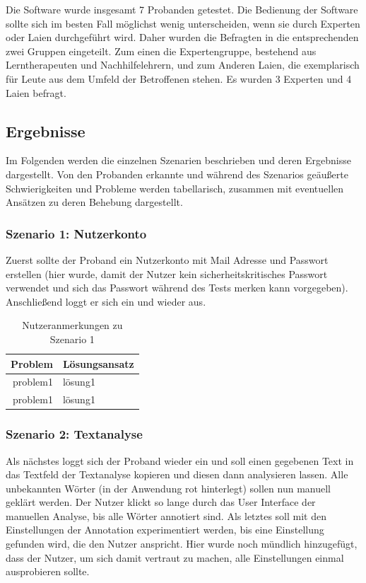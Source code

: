 Die Software wurde insgesamt 7 Probanden getestet. Die Bedienung der Software sollte sich im besten Fall möglichst wenig unterscheiden, wenn sie durch Experten oder Laien durchgeführt wird. Daher wurden die Befragten in die entsprechenden zwei Gruppen eingeteilt. Zum einen die Expertengruppe, bestehend aus Lerntherapeuten und Nachhilfelehrern, und zum Anderen Laien, die exemplarisch für Leute aus dem Umfeld der Betroffenen stehen. Es wurden 3 Experten und 4 Laien befragt.\\

\subsection{Ergebnisse}

Im Folgenden werden die einzelnen Szenarien beschrieben und deren Ergebnisse dargestellt. Von den Probanden erkannte und während des Szenarios geäußerte Schwierigkeiten und Probleme werden tabellarisch, zusammen mit eventuellen Ansätzen zu deren Behebung dargestellt.

\subsubsection{Szenario 1: Nutzerkonto}

Zuerst sollte der Proband ein Nutzerkonto mit Mail Adresse und Passwort erstellen (hier wurde, damit der Nutzer kein sicherheitskritisches Passwort verwendet und sich das Passwort während des Tests merken kann  vorgegeben). Anschließend loggt er sich ein und wieder aus.


\begin{table}[h!]
	\centering
	\begin{tabular}{|r|l|}
		\hline
		\textbf{Problem} & \textbf{Lösungsansatz}\\
		\hline
		\hline
		problem1 & lösung1\\
		\hline
		problem1 & lösung1\\
		\hline
	\end{tabular}
	\caption{Nutzeranmerkungen zu Szenario 1}
	\label{table:szenario1}
\end{table}

\subsubsection{Szenario 2: Textanalyse}

Als nächstes loggt sich der Proband wieder ein und soll einen gegebenen Text in das Textfeld der Textanalyse kopieren und diesen dann analysieren lassen. Alle unbekannten Wörter (in der Anwendung rot hinterlegt) sollen nun manuell geklärt werden. Der Nutzer klickt so lange durch das User Interface der manuellen Analyse, bis alle Wörter annotiert sind. Als letztes soll mit den Einstellungen der Annotation experimentiert werden, bis eine Einstellung gefunden wird, die den Nutzer anspricht. Hier wurde noch mündlich hinzugefügt, dass der Nutzer, um sich damit vertraut zu machen, alle Einstellungen einmal ausprobieren sollte.

